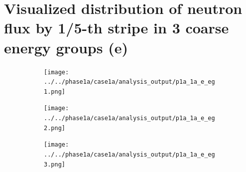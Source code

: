 \documentclass[letterpaper,11pt]{report}
\begin{document}
\pagebreak 

\section{Visualized distribution of neutron flux by 1/5-th stripe in 3 coarse energy groups (e)}
\begin{figure}[H]
    \centering
    \begin{subfigure}{.33\textwidth}
        \centering
        \texttt{[image: ../../phase1a/case1a/analysis\_output/p1a\_1a\_e\_eg1.png]}
        \caption{}
      \end{subfigure}%
      \begin{subfigure}{.33\textwidth}
        \centering
        \texttt{[image: ../../phase1a/case1a/analysis\_output/p1a\_1a\_e\_eg2.png]}
        \caption{}
      \end{subfigure}
      \begin{subfigure}{.33\textwidth}
        \centering
        \texttt{[image: ../../phase1a/case1a/analysis\_output/p1a\_1a\_e\_eg3.png]}
        \caption{}
      \end{subfigure}


\end{figure}
\end{document}
